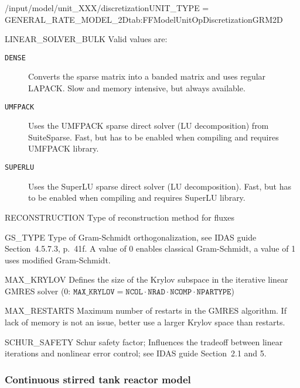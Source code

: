 \begin{condsubgroup}{/input/model/unit\_XXX/discretization}{UNIT\_TYPE = GENERAL\_RATE\_MODEL\_2D}{tab:FFModelUnitOpDiscretizationGRM2D}
\begin{dataset}[type=string,range={$\{\texttt{DENSE},\texttt{UMFPACK},\texttt{SUPERLU}\}$},length={1}]{LINEAR\_SOLVER\_BULK}
    Valid values are:
    \begin{description}
      \item[\texttt{DENSE}] Converts the sparse matrix into a banded matrix and uses regular LAPACK. Slow and memory intensive, but always available.
      \item[\texttt{UMFPACK}] Uses the UMFPACK sparse direct solver (LU decomposition) from SuiteSparse. Fast, but has to be enabled when compiling and requires UMFPACK library.
      \item[\texttt{SUPERLU}] Uses the SuperLU sparse direct solver (LU decomposition). Fast, but has to be enabled when compiling and requires SuperLU library.
    \end{description}\vspace{-\baselineskip}
  \end{dataset}
  \begin{dataset}[type=string,range={\texttt{WENO}},length={1}]{RECONSTRUCTION}
    Type of reconstruction method for fluxes
  \end{dataset}
  \begin{dataset}[type=int,range={$\{0, 1\}$},length=1]{GS\_TYPE}
    Type of Gram-Schmidt orthogonalization, see IDAS guide Section~4.5.7.3, p.~41f.
    A value of $0$ enables classical Gram-Schmidt, a value of 1 uses modified Gram-Schmidt.
  \end{dataset}
  \begin{dataset}[type=int,range={$\{0, \dots, \texttt{NCOL} \cdot \texttt{NRAD} \cdot \texttt{NCOMP} \cdot \texttt{NPARTYPE} \}$},length=1]{MAX\_KRYLOV}
    Defines the size of the Krylov subspace in the iterative linear GMRES solver (0: $\texttt{MAX\_KRYLOV} = \texttt{NCOL} \cdot \texttt{NRAD} \cdot \texttt{NCOMP} \cdot \texttt{NPARTYPE}$)
  \end{dataset}
  \begin{dataset}[type=int,range={$\geq 0$},length=1]{MAX\_RESTARTS}
    Maximum number of restarts in the GMRES algorithm. If lack of memory is not an issue, better use a larger Krylov space than restarts.
  \end{dataset}
  \begin{dataset}[type=double,range={$\geq 0$},length=1]{SCHUR\_SAFETY}
    Schur safety factor; Influences the tradeoff between linear iterations and nonlinear error control; see IDAS guide Section~2.1 and 5.
  \end{dataset}
\end{condsubgroup}

\subsubsection{Continuous stirred tank reactor model}

